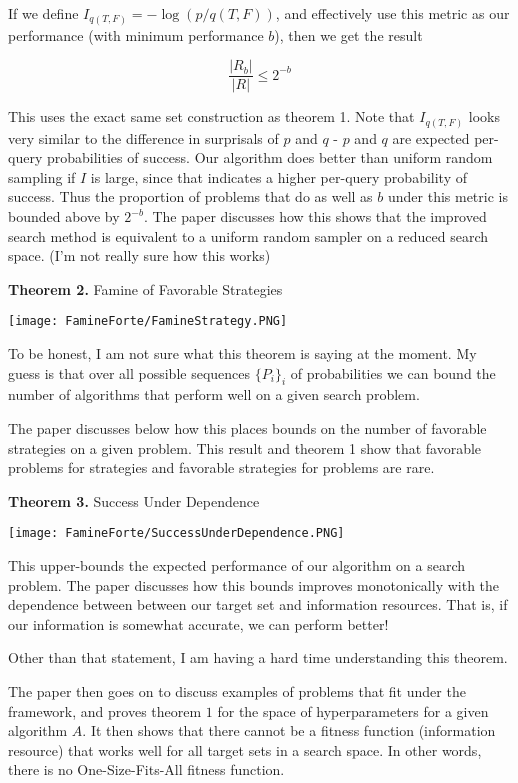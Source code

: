 \documentclass[12pt]{article}
\begin{document}
If we define $I_{q(T,F)} = - \log(p/q(T,F))$, and effectively use this metric as our performance (with minimum performance $b$), then we get the result 

\[\frac{|R_b|}{|R|} \leq 2^{-b}\]

This uses the exact same set construction as theorem 1. Note that $I_{q(T,F)}$ looks very similar to the difference in surprisals of $p$ and $q$ - $p$ and $q$ are expected per-query probabilities of success. Our algorithm does better than uniform random sampling if $I$ is large, since that indicates a higher per-query probability of success. Thus the proportion of problems that do as well as $b$ under this metric is bounded above by $2^{-b}$. The paper discusses how this shows that the improved search method is equivalent to a uniform random sampler on a reduced search space. (I'm not really sure how this works) 

\bigskip

\textbf{Theorem 2.} Famine of Favorable Strategies
\begin{center}
    \texttt{[image: FamineForte/FamineStrategy.PNG]}
\end{center}

To be honest, I am not sure what this theorem is saying at the moment. My guess is that over all possible sequences $\{P_i\}_i$ of probabilities we can bound the number of algorithms that perform well on a given search problem. 

The paper discusses below how this places bounds on the number of favorable strategies on a given problem. This result and theorem 1 show that favorable problems for strategies and favorable strategies for problems are rare. 

\bigskip

\textbf{Theorem 3.} Success Under Dependence
\begin{center}
    \texttt{[image: FamineForte/SuccessUnderDependence.PNG]}
\end{center}

This upper-bounds the expected performance of our algorithm on a search problem. The paper discusses how this bounds improves monotonically with the dependence between between our target set and information resources. That is, if our information is somewhat accurate, we can perform better! 

Other than that statement, I am having a hard time understanding this theorem. 


\bigskip

The paper then goes on to discuss examples of problems that fit under the framework, and proves theorem $1$ for the space of hyperparameters for a given algorithm $A$. It then shows that there cannot be a fitness function (information resource) that works well for all target sets in a search space. In other words, there is no One-Size-Fits-All fitness function. 
\end{document}
